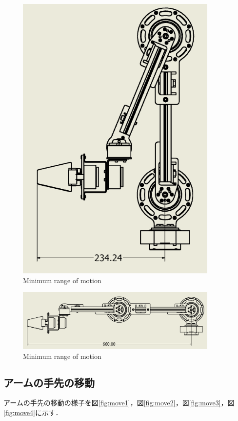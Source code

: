 \begin{figure}[htbp]
  \centering
  \includegraphics[width=10cm]{images/design/arm_short.png}
  \caption{Minimum range of motion}
  \label{fig:arm_short}
\end{figure}

\begin{figure}[htbp]
  \centering
  \includegraphics[width=10cm]{images/design/arm_long.png}
  \caption{Minimum range of motion}
  \label{fig:arm_long}
\end{figure}

\subsection{アームの手先の移動}
アームの手先の移動の様子を図\ref{fig:move1}，図\ref{fig:move2}，図\ref{fig:move3}，図\ref{fig:move4}に示す．

